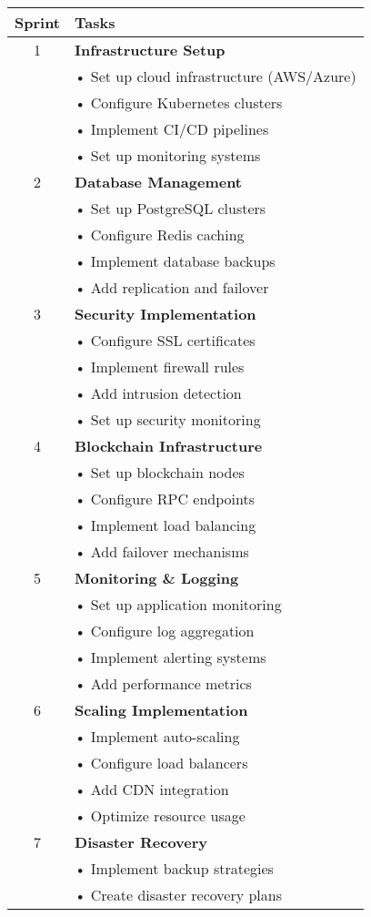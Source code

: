 \documentclass{article}
\begin{document}
\begin{longtable}{|c|p{}|}
\hline
\textbf{Sprint} & \textbf{Tasks} \\
\hline
1 & \textbf{Infrastructure Setup}\\
& • Set up cloud infrastructure (AWS/Azure)\\
& • Configure Kubernetes clusters\\
& • Implement CI/CD pipelines\\
& • Set up monitoring systems\\
\hline
2 & \textbf{Database Management}\\
& • Set up PostgreSQL clusters\\
& • Configure Redis caching\\
& • Implement database backups\\
& • Add replication and failover\\
\hline
3 & \textbf{Security Implementation}\\
& • Configure SSL certificates\\
& • Implement firewall rules\\
& • Add intrusion detection\\
& • Set up security monitoring\\
\hline
4 & \textbf{Blockchain Infrastructure}\\
& • Set up blockchain nodes\\
& • Configure RPC endpoints\\
& • Implement load balancing\\
& • Add failover mechanisms\\
\hline
5 & \textbf{Monitoring \& Logging}\\
& • Set up application monitoring\\
& • Configure log aggregation\\
& • Implement alerting systems\\
& • Add performance metrics\\
\hline
6 & \textbf{Scaling Implementation}\\
& • Implement auto-scaling\\
& • Configure load balancers\\
& • Add CDN integration\\
& • Optimize resource usage\\
\hline
7 & \textbf{Disaster Recovery}\\
& • Implement backup strategies\\
& • Create disaster recovery plans\\

\end{longtable}
\end{document}
